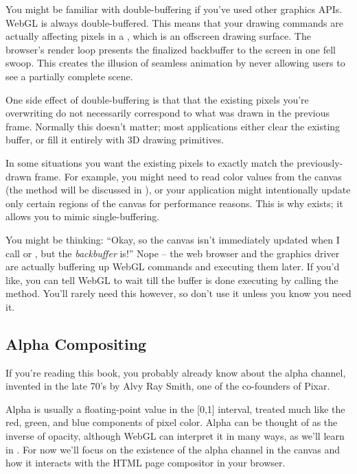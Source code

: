 You might be familiar with  double-buffering if you've used other graphics APIs.  WebGL is always double-buffered.  This means that your drawing commands are actually affecting pixels in a  , which is an offscreen drawing surface.  The browser's render loop presents the finalized backbuffer to the screen in one fell swoop.  This creates the illusion of seamless animation by never allowing users to see a partially complete scene.

One side effect of double-buffering is that that the existing pixels you're overwriting do not necessarily correspond to what was drawn in the previous frame.  Normally this doesn't matter; most applications either clear the existing buffer, or fill it entirely with 3D drawing primitives.

In some situations you want the existing pixels to exactly match the previously-drawn frame.  For example, you might need to read color values from the canvas (the   method will be discussed in ), or your application might intentionally update only certain regions of the canvas for performance reasons.  This is why  exists; it allows you to mimic  single-buffering.

You might be thinking: ``Okay, so the canvas isn't immediately updated when I call  or , but the \emph{backbuffer} is!''  Nope -- the web browser and the graphics driver are actually buffering up WebGL commands and executing them later.  If you'd like, you can tell WebGL to wait till the buffer is done executing by calling the   method.  You'll rarely need this however, so don't use it unless you know you need it.

\subsection{Alpha Compositing}

If you're reading this book, you probably already know about the alpha channel, invented in the late 70's by Alvy Ray Smith, one of the co-founders of Pixar.

Alpha is usually a floating-point value in the [0,1] interval, treated much like the red, green, and blue components of pixel color.  Alpha can be thought of as the inverse of opacity, although WebGL can interpret it in many ways, as we'll learn in .  For now we'll focus on the existence of the alpha channel in the canvas and how it interacts with the HTML page compositor in your browser.


